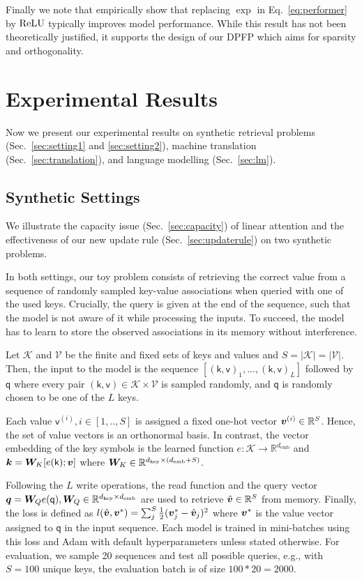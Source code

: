 \documentclass{article}
\theoremstyle{definition}
\begin{document}
Finally we note that \citet{choromanski2020rethinking} empirically show that replacing $\exp$
in Eq.~\ref{eq:performer} by $\mathrm{ReLU}$ typically improves model performance.
While this result has not been theoretically justified, it supports the
design of our DPFP which aims for sparsity and orthogonality.

\section{Experimental Results}
Now we present our experimental results on
synthetic retrieval problems (Sec.~\ref{sec:setting1} and \ref{sec:setting2}),
 machine translation (Sec.~\ref{sec:translation}), and language modelling (Sec.~\ref{sec:lm}).
\subsection{Synthetic Settings}
\label{sec:synthetic}
We illustrate the capacity issue (Sec.~\ref{sec:capacity}) of 
linear attention and the effectiveness of our new update rule (Sec.~\ref{sec:updaterule}) on two synthetic problems.

In both settings, our toy problem consists of retrieving the correct value from a sequence of randomly sampled key-value associations when queried with one of the used keys.
Crucially, the query is given at the end of the sequence, such that the model is not aware of it
while processing the inputs.
To succeed, the model has to learn to store the observed associations in its memory without interference. 

Let $\mathcal{K}$ and $\mathcal{V}$ be the finite and fixed sets of keys and values and $S=|\mathcal{K}|=|\mathcal{V}|$. 
Then, the input to the model is the sequence 
$[(\mathsf{k},\mathsf{v})_1, ..., (\mathsf{k},\mathsf{v})_L]$ 
followed by $\mathsf{q}$ 
where every pair $(\mathsf{k},\mathsf{v}) \in \mathcal{K} \times \mathcal{V}$ is sampled randomly,
and $\mathsf{q}$ is randomly chosen to be one of the $L$ keys.

Each value $\mathsf{v}^{(i)}, i \in [1,..,S]$ is assigned a fixed one-hot vector ${\bm{v}}^{(i)} \in \mathbb{R}^S$. Hence, the set of value vectors is an orthonormal basis.
In contrast, the vector embedding of the key symbols is the learned function $e: \mathcal{K} \rightarrow \mathbb{R}^{d_\text{emb}}$
and ${\bm{k}} = {\bm{W}}_K [e(\mathsf{k});{\bm{v}}]$ 
where ${\bm{W}}_K \in \mathbb{R}^{d_\text{key} \times (d_\text{emb} + S)}$.

Following the $L$ write operations, the read function and the query vector 
${\bm{q}} = {\bm{W}}_Q e(\mathsf{q}), {\bm{W}}_Q \in \mathbb{R}^{d_\text{key} \times d_\text{emb}}$ 
are used to retrieve $\hat{{\bm{v}}} \in \mathbb{R}^S$ from memory.
Finally, the loss is defined as 
$l(\hat{{\bm{v}}},{\bm{v}}^*) = \sum_j^S \frac{1}{2}({\bm{v}}^*_j - \hat{{\bm{v}}}_j)^2$ 
where ${\bm{v}}^*$ is the value vector assigned to $\mathsf{q}$ in the input sequence. 
Each model is trained in mini-batches using this loss and Adam with default hyperparameters unless stated otherwise.
For evaluation, we sample 20 sequences and test all possible queries,
e.g., with $S=100$ unique keys, the evaluation batch is of size $100*20=2000$.
\end{document}
